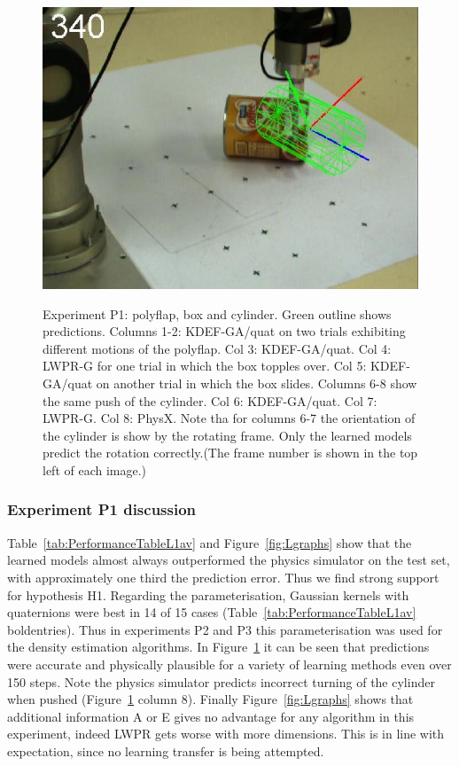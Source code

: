 \begin{figure}[htbp]
{\includegraphics[width=\imgAXwid]{images/A3_physx_39_5}
}
\caption {Experiment P1: polyflap, box and cylinder. Green outline shows
  predictions. Columns 1-2: KDEF-GA/quat on two trials exhibiting
  different motions of the polyflap. Col 3: KDEF-GA/quat. Col 4: LWPR-G for one trial in
  which the box topples over. Col 5: KDEF-GA/quat on another trial in
  which the box slides. Columns 6-8 show the same push of the
  cylinder. Col 6: KDEF-GA/quat. Col 7: LWPR-G. Col 8: PhysX. Note tha
  for columns 6-7 the orientation of the cylinder is show by the
  rotating frame. Only the learned models predict the rotation
  correctly.(The
  frame number is shown in the top left of each image.)  }
\label{fig:ExperimentL2}
\end{figure}
\subsubsection{Experiment P1 discussion} Table~\ref{tab:PerformanceTableL1av} and Figure~\ref{fig:Lgraphs} show that the learned models almost always outperformed the physics simulator on the test set, with approximately one third the prediction error. Thus we find strong support for hypothesis H1. Regarding the parameterisation, Gaussian kernels with quaternions were best in 14 of 15 cases  (Table~\ref{tab:PerformanceTableL1av} boldentries). Thus in experiments P2 and P3 this parameterisation was used for the density estimation algorithms.
In Figure~\ref{fig:ExperimentL2} it can be
seen that predictions were accurate and physically plausible for a
variety of learning methods even over 150 steps. Note the physics
simulator predicts incorrect turning of the cylinder when pushed
(Figure~\ref{fig:ExperimentL2} column 8). Finally Figure~\ref{fig:Lgraphs} shows that additional information A or E gives no advantage for any algorithm in this experiment, indeed LWPR gets worse with more dimensions. This is in line with expectation, since no learning transfer is being attempted.

